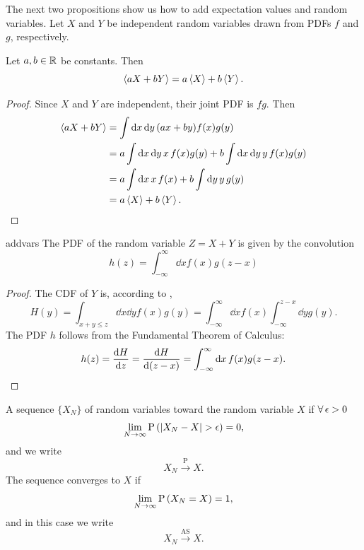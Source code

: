 The next two propositions show us how to add expectation values and
random variables. Let $X$ and $Y$ be independent random variables 
drawn from PDFs $f$ and $g$, respectively.
\begin{proposition}{}{}
  Let $a,b\in\mathbb{R}$ be constants. Then
  $$\ev{aX+bY}=a\ev{X}+b\ev{Y}.$$
  \begin{proof}
    Since $X$ and $Y$ are independent, their joint PDF is $fg$. Then
    \begin{equation*}
      \begin{aligned}
      \ev{aX+bY}&=\int\dd{x}\dd{y}(ax+by)f(x)g(y)\\
                &=a\int\dd{x}\dd{y}x\,f(x)g(y)+
                 b\int\dd{x}\dd{y}y\,f(x)g(y)\\
                &=a\int\dd{x}x\,f(x)+b\int\dd{y}y\,g(y)\\
                &=a\ev{X}+b\ev{Y}.
      \end{aligned}
    \end{equation*}
  \end{proof}
\end{proposition}

\begin{proposition}{}{addvars}
  The PDF of the random variable $Z=X+Y$ is given by the convolution
  \begin{equation*}
    h(z)=\int_{-\infty}^\infty\dd{x}f(x)g(z-x)
  \end{equation*}
  \begin{proof}
    The CDF of $Y$ is, according to ,
    \begin{equation*}
      H(y)=\int_{x+y\leq z}\dd{x}\dd{y}f(x)g(y)
          =\int_{-\infty}^\infty\dd{x}f(x)\int_{-\infty}^{z-x}
            \dd{y}g(y).
    \end{equation*}
    The PDF $h$ follows from the Fundamental Theorem of Calculus:
    \begin{equation*}
      h(z)=\dv{H}{z}=\dv{H}{(z-x)}
          =\int_{-\infty}^\infty\dd{x}f(x)g(z-x).
    \end{equation*}
  \end{proof}
\end{proposition}

A sequence $\{X_N\}$ of random variables 
toward the random variable $X$ if $\operatorname{\forall}\epsilon>0$ 
\begin{equation}
  \lim_{N\to\infty}\pr{|X_N-X|>\epsilon}=0,
\end{equation}
and we write
\begin{equation}
  X_N\xrightarrow{\text{P}}X.
\end{equation}
The sequence converges to $X$ 
 if
\begin{equation}
  \lim_{N\to\infty}\operatorname{P}\left(X_N=X\right)=1,
\end{equation}
and in this case we write
\begin{equation}
  X_N\xrightarrow{\text{AS}}X.
\end{equation}

